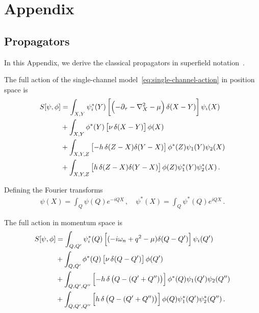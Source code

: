 \chapter{Appendix}

\section{Propagators}
\label{app:propagators}

In this Appendix, we derive the classical propagators in superfield notation~\cite{Pawlowski2021}.

The full action of the single-channel model~\eqref{eq:single-channel-action} in position space is~\cite{Boettcher2012}
\begin{align}
    S[\psi, \phi] &= \int_{X,Y} \psi^*_i(Y)
    \left[\left(-\partial_{\tau} - \nabla_X^2 - \mu\right) \delta(X-Y)\right] \psi_i(X) \notag \\
    &+ \int_{X,Y} \phi^*(Y)
    \left[\nu\, \delta(X-Y)\right] \phi(X) \notag \\
    &+ \int_{X,Y,Z} \left[-h \, \delta(Z-X) \delta(Y-X)\right]
	\phi^*(Z) \psi_1(Y) \psi_2(X) \notag \\
	&+ \int_{X,Y,Z} \left[h \, \delta(Z-X) \delta(Y-X)\right]
	\phi(Z) \psi_1^*(Y) \psi_2^*(X) \,.
\end{align}

Defining the Fourier transforms
\begin{align}
    \psi(X) = \int_Q \psi(Q) e^{-iQX} \,, \quad
    \psi^*(X) = \int_Q \psi^*(Q) e^{iQX} \,.
\end{align}

The full action in momentum space is
\begin{align}
    S[\psi, \phi] &= \int_{Q,Q'} \psi^*_i(Q)
    \left[(-i\omega_n + q^2 - \mu) \delta(Q-Q')\right] \psi_i(Q') \notag \\
    &+ \int_{Q,Q'} \phi^*(Q)
    \left[\nu\, \delta(Q-Q')\right] \phi(Q') \notag \\
    &+ \int_{Q,Q',Q''} \left[-h \, \delta\left(Q - (Q'+Q'')\right)\right]
	\phi^*(Q) \psi_1(Q') \psi_2(Q'') \notag \\
	&+ \int_{Q,Q',Q''} \left[h \, \delta\left(Q - (Q'+Q'')\right)\right]
	\phi(Q) \psi_1^*(Q') \psi_2^*(Q'') \,.
\end{align}



